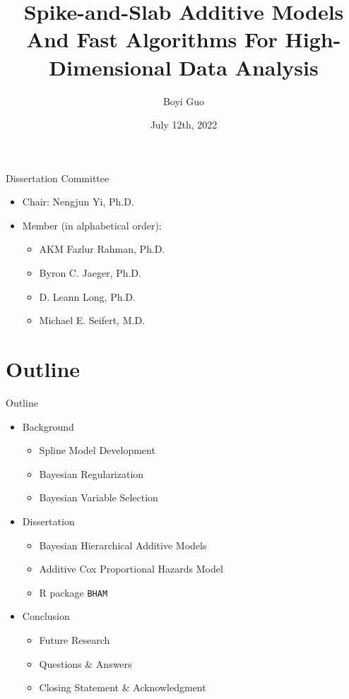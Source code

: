 \documentclass[
  ignorenonframetext,
  aspectratio=169]{beamer}
\title{Spike-and-Slab Additive Models And Fast Algorithms For
High-Dimensional Data Analysis}
\author{Boyi Guo}
\date{July 12th, 2022}
\institute{Department of Biostatistics\\
University of Alabama at Birmingham}
\providecommand{\tightlist}{%
  \setlength{\itemsep}{0pt}\setlength{\parskip}{0pt}}
\begin{document}
\frame{\titlepage}

\begin{frame}{Dissertation Committee}
\protect\hypertarget{dissertation-committee}{}
\begin{itemize}
\tightlist
\item
  Chair: Nengjun Yi, Ph.D.
\item
  Member (in alphabetical order):

  \begin{itemize}
  \tightlist
  \item
    AKM Fazlur Rahman, Ph.D.
  \item
    Byron C. Jaeger, Ph.D.
  \item
    D. Leann Long, Ph.D.
  \item
    Michael E. Seifert, M.D.
  \end{itemize}
\end{itemize}
\end{frame}

\hypertarget{outline}{%
\section*{Outline}\label{outline}}

\begin{frame}[fragile]{Outline}
\begin{itemize}
\tightlist
\item
  Background

  \begin{itemize}
  \tightlist
  \item
    Spline Model Development
  \item
    Bayesian Regularization
  \item
    Bayesian Variable Selection
  \end{itemize}
\item
  Dissertation

  \begin{itemize}
  \tightlist
  \item
    Bayesian Hierarchical Additive Models
  \item
    Additive Cox Proportional Hazards Model
  \item
    R package \texttt{BHAM}
  \end{itemize}
\item
  Conclusion

  \begin{itemize}
  \tightlist
  \item
    Future Research
  \item
    Questions \& Answers
  \item
    Closing Statement \& Acknowledgment
  \end{itemize}
\end{itemize}
\end{frame}
\end{document}
